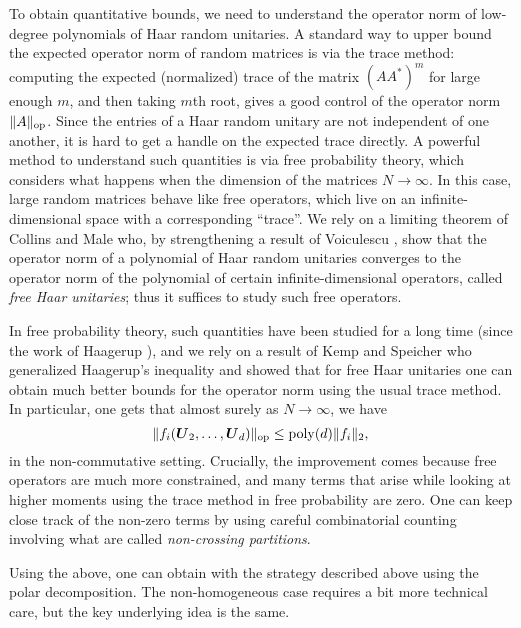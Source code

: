 To obtain quantitative bounds, we need to understand the operator norm of low-degree polynomials of Haar random unitaries. A standard way to upper bound the expected operator norm of random matrices is via the trace method: computing the expected (normalized) trace of the matrix $(AA^*)^m$ for large enough $m$, and then taking $m$th root, gives a good control of the operator norm $\|A\|_{\mathrm{op}}$. Since the entries of a Haar random unitary are not independent of one another, it is hard to get a handle on the expected trace directly. A powerful method to understand such quantities is via free probability theory, which considers what happens when the dimension of the matrices $N \to \infty$. In this case, large random matrices behave like free operators, which live on an infinite-dimensional space with a corresponding ``trace''. We rely on a limiting theorem of Collins and Male \cite{CM11} who, by strengthening a result of Voiculescu \cite{V98}, show that the operator norm of a polynomial of Haar random unitaries converges to the operator norm of the polynomial of certain infinite-dimensional operators, called \emph{free Haar unitaries}; thus it suffices to study such free operators.



In free probability theory, such quantities have been studied for a long time (since the work of Haagerup \cite{H78}), and we rely on a result of Kemp and Speicher \cite{KS05} who generalized Haagerup's inequality  and showed that for free Haar unitaries one can obtain much better bounds for the operator norm using the usual trace method. In particular, one gets that almost surely as $N \to \infty$, we have
\[
\|f_i(\boldsymbol{U}_2,\ldots, \boldsymbol{U}_d)\|_{\mathrm{op}} \le \mathrm{poly}(d) \|f_i\|_2,
\]
in the non-commutative setting. Crucially, the improvement comes because free operators are much more constrained, and many terms that arise while looking at higher moments using the trace method in free probability are zero. One can keep close track of the non-zero terms by using careful combinatorial counting involving what are called \emph{non-crossing partitions}.  

Using the above, one can obtain  with the strategy described above using the polar decomposition. The non-homogeneous case requires a bit more technical care, but the key underlying idea is the same.






